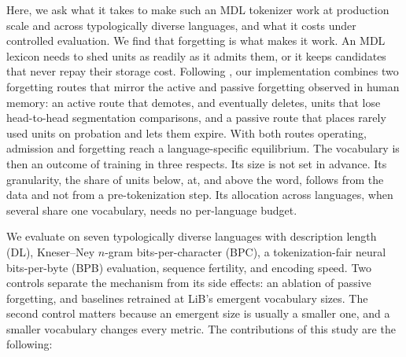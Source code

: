 \documentclass[pdflatex,sn-apa]{sn-jnl}
\begin{document}
Here, we ask what it takes to make such an MDL tokenizer work at production
scale and across typologically diverse languages, and what it costs under
controlled evaluation.
We find that forgetting is what makes it work.
An MDL lexicon needs to shed units as readily as it admits them, or it keeps
candidates that never repay their storage cost.
Following \citet{yang2020less}, our implementation combines two forgetting
routes that mirror the active and passive forgetting observed in human
memory: an active route that demotes, and eventually deletes, units
that lose head-to-head segmentation comparisons, and a passive route
that places rarely used units on probation and lets them expire.
With both routes operating, admission and forgetting reach a
language-specific equilibrium. The vocabulary is then an outcome of training
in three respects. Its size is not set in advance. Its granularity, the share
of units below, at, and above the word, follows from the data and not from a
pre-tokenization step. Its allocation across languages, when several share
one vocabulary, needs no per-language budget.

We evaluate on seven typologically diverse languages with description length
(DL), Kneser--Ney $n$-gram bits-per-character (BPC), a tokenization-fair
neural bits-per-byte (BPB) evaluation, sequence fertility, and encoding speed.
Two controls separate the mechanism from its side effects: an ablation of
passive forgetting, and baselines retrained at LiB's emergent vocabulary
sizes. The second control matters because an emergent size is usually a
smaller one, and a smaller vocabulary changes every metric.
The contributions of this study are the following:
\end{document}
